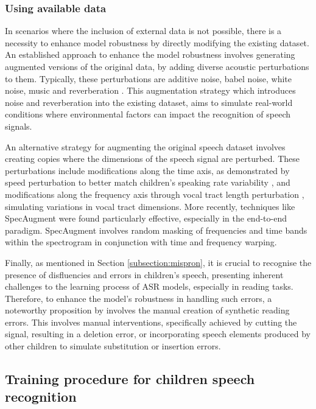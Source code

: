 \subsubsection{Using available data}

In scenarios where the inclusion of external data is not possible, there is a necessity to enhance model robustness by directly modifying the existing dataset. An established approach to enhance the model robustness involves generating augmented versions of the original data, by adding diverse acoustic perturbations to them. Typically, these perturbations are additive noise, babel noise, white noise, music and reverberation \cite{liu2003noise,whitenoise,gelin2020babble,couvreur2000use,malek2017robust}. This augmentation strategy which introduces noise and reverberation into the existing dataset, aims to simulate real-world conditions where environmental factors can impact the recognition of speech signals.

An alternative strategy for augmenting the original speech dataset involves creating copies where the dimensions of the speech signal are perturbed. These perturbations include modifications along the time axis, as demonstrated by speed perturbation to better match children's speaking rate variability \cite{lo2020ntnu}, and modifications along the frequency axis \cite{singh2022spectral} through vocal tract length perturbation \cite{VTLP}, simulating variations in vocal tract dimensions. More recently, techniques like SpecAugment \cite{specaugment} were found particularly effective, especially in the end-to-end paradigm. SpecAugment involves random masking of frequencies and time bands within the spectrogram in conjunction with time and frequency warping.

Finally, as mentioned in Section \ref{subsection:mispron}, it is crucial to recognise the presence of disfluencies and errors in children's speech, presenting inherent challenges to the learning process of \ac{ASR} models, especially in reading tasks. Therefore, to enhance the model's robustness in handling such errors, a noteworthy proposition by \cite{gelin2021simulating} involves the manual creation of synthetic reading errors. This involves manual interventions, specifically achieved by cutting the signal, resulting in a deletion error, or incorporating speech elements produced by other children to simulate substitution or insertion errors.


\subsection{Training procedure for children speech recognition}%

